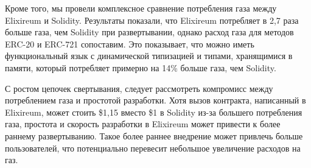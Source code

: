 Кроме того, мы провели комплексное сравнение потребления газа между Elixireum и Solidity. Результаты показали, что Elixireum потребляет в 2,7 раза больше газа, чем Solidity при развертывании, однако расход газа для методов ERC-20 и ERC-721 сопоставим. Это показывает, что можно иметь функциональный язык с динамической типизацией и типами, хранящимися в памяти, который потребляет примерно на 14\% больше газа, чем Solidity.

С ростом цепочек свертывания, следует рассмотреть компромисс между потреблением газа и простотой разработки. Хотя вызов контракта, написанный в Elixireum, может стоить \$1,15 вместо \$1 в Solidity из-за большего потребления газа, простота и скорость разработки в Elixireum может привести к более раннему развертыванию. Такое более раннее внедрение может привлечь больше пользователей, что потенциально перевесит небольшое увеличение расходов на газ.